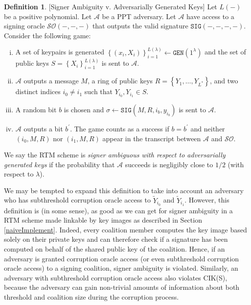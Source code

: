 \documentclass[12pt,english,oneside]{mrl}
\theoremstyle{definition}
\newtheorem{Defn}[lem]{Definition}
\newenvironment{defn}{\begin{Defn}\rm}{\end{Defn}}
\numberwithin{equation}{section}
\numberwithin{figure}{section}
\numberwithin{equation}{section}
\numberwithin{equation}{section}
\numberwithin{figure}{section}
\begin{document}
\begin{defn}{[Signer Ambiguity v. Adversarially Generated Keys]} Let $L(-)$ be a positive polynomial. Let $\mathcal{A}$ be a PPT adversary. Let $\mathcal{A}$ have access to a signing oracle $\mathcal{SO}(-,-,-)$ that outputs the valid signature $\texttt{SIG}(-,-,-,-)$. Consider the following game:
\begin{enumerate}[(i)]
\item A set of keypairs is generated $\left\{(x_i, X_i)\right\}_{i=1}^{L(\lambda)} \leftarrow \texttt{GEN}(1^\lambda)$ and the set of public keys $S = \left\{X_i\right\}_{i=1}^{L(\lambda)}$ is sent to $\mathcal{A}$.
\item $\mathcal{A}$ outputs a message $M$, a ring of public keys $R = \left\{Y_1, \ldots, Y_{L^*}\right\}$, and two distinct indices $i_0 \neq i_1$ such that $Y_{i_0}, Y_{i_1} \in S$.
\item A random bit $b$ is chosen and $\sigma \leftarrow \texttt{SIG}(M,R,i_b,y_{i_b})$ is sent to $\mathcal{A}$.
\item $\mathcal{A}$ outputs a bit $b^{\prime}$. The game counts as a success if $b = b^{\prime}$ and neither $(i_0,M,R)$ nor $(i_1,M,R)$ appear in the transcript between $\mathcal{A}$ and $\mathcal{SO}$.
\end{enumerate}
We say the RTM scheme is \textit{signer ambiguous with respect to adversarially generated keys} if the probability that $\mathcal{A}$ succeeds is negligibly close to $1/2$ (with respect to $\lambda$).
\end{defn}

We may be tempted to expand this definition to take into account an adversary who has subthreshold corruption oracle access to $\tilde{Y}_{i_0}$ and $\tilde{Y}_{i_1}$. However, this definition is (in some sense), as good as we can get for signer ambiguity in a RTM scheme made linkable by key images as described in Section \ref{naiveImplement}. Indeed, every coalition member computes the key image based solely on their private keys and can therefore check if a signature has been computed on behalf of the shared public key of the coalition.  Hence, if an adversary is granted corruption oracle access (or even subthreshold corruption oracle access) to a signing coalition, signer ambiguity is violated. Similarly, an adversary with subthreshold corruption oracle access also violates CIK(S), because the adversary can gain non-trivial amounts of information about both threshold and coalition size during the corruption process. 
\end{document}
